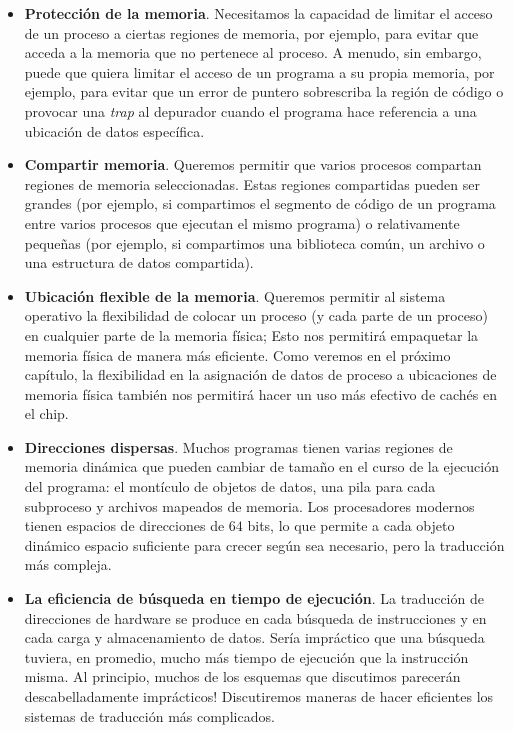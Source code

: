\documentclass[10pt]{book}
\begin{document}
\begin{itemize}
\item \textbf{Protección de la memoria}. Necesitamos la capacidad de limitar el acceso de un proceso a ciertas regiones de memoria, por ejemplo, para evitar que acceda a la memoria que no pertenece al proceso. A menudo, sin embargo, puede que quiera limitar el acceso de un programa a su propia memoria, por ejemplo, para evitar que un error de puntero sobrescriba la región de código o provocar una \textit{trap} al depurador cuando el programa hace referencia a una ubicación de datos específica.

\item \textbf{Compartir memoria}. Queremos permitir que varios procesos compartan regiones de memoria seleccionadas. Estas regiones compartidas pueden ser grandes (por ejemplo, si compartimos el segmento de código de un programa entre varios procesos que ejecutan el mismo programa) o relativamente pequeñas (por ejemplo, si compartimos una biblioteca común, un archivo o una estructura de datos compartida).

\item \textbf{Ubicación flexible de la memoria}. Queremos permitir al sistema operativo la flexibilidad de colocar un proceso (y cada parte de un proceso) en cualquier parte de la memoria física; Esto nos permitirá empaquetar la memoria física de manera más eficiente. Como veremos en el próximo capítulo, la flexibilidad en la asignación de datos de proceso a ubicaciones de memoria física también nos permitirá hacer un uso más efectivo de cachés en el chip.

\item \textbf{Direcciones dispersas}. Muchos programas tienen varias regiones de memoria dinámica que pueden cambiar de tamaño en el curso de la ejecución del programa: el montículo de objetos de datos, una pila para cada subproceso y archivos mapeados de memoria. Los procesadores modernos tienen espacios de direcciones de $64$ bits, lo que permite a cada objeto dinámico espacio suficiente para crecer según sea necesario, pero la traducción más compleja.

\item \textbf{La eficiencia de búsqueda en tiempo de ejecución}. La traducción de direcciones de hardware se produce en cada búsqueda de instrucciones y en cada carga y almacenamiento de datos. Sería impráctico que una búsqueda tuviera, en promedio, mucho más tiempo de ejecución que la instrucción misma. Al principio, muchos de los esquemas que discutimos parecerán descabelladamente imprácticos! Discutiremos maneras de hacer eficientes los sistemas de traducción más complicados.


\end{itemize}
\end{document}
